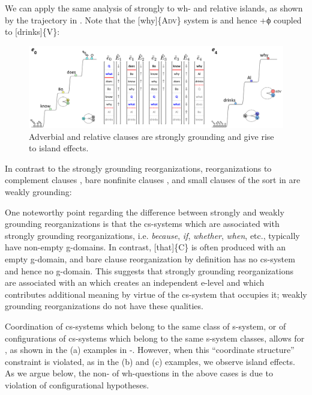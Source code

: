   We can apply the same analysis of strongly  to wh- and relative islands, as shown by the trajectory in {}. Note that the [why]\{A\textsc{dv}\} system is  and hence +ϕ coupled to [drinks]\{V\}:

  
\begin{figure}
\includegraphics[width=\textwidth]{figures/Tilsen-img164.png}
\caption{Adverbial and relative clauses are strongly grounding and give rise to island effects.}
\label{fig:7:20}
\end{figure}
 

  In contrast to the strongly grounding reorganizations, reorganizations to complement clauses , bare nonfinite clauses , and small clauses of the sort in  are weakly grounding:

\ea\label{ex:7:21}
\label{ex:7:21a}
\label{ex:7:21b}
\label{ex:7:21c}
\z
\z

  One noteworthy point regarding the difference between strongly and weakly grounding reorganizations is that the cs-systems which are associated with strongly grounding reorganizations, i.e. \textit{because}, \textit{if}, \textit{whether}, \textit{when}, etc., typically have non-empty g-domains. In contrast, [that]\{C\} is often produced with an empty g-domain, and bare clause reorganization by definition has no cs-system and hence no g-domain. This suggests that strongly grounding reorganizations are associated with an  which creates an independent e-level and which contributes additional meaning by virtue of the cs-system that occupies it; weakly grounding reorganizations do not have these qualities.

  Coordination of cs-systems which belong to the same class of s-system, or of configurations of cs-systems which belong to the same s-system classes, allows for , as shown in the (a) examples in {-}. However, when this “coordinate structure” constraint is violated, as in the (b) and (c) examples, we observe island effects. As we argue below, the non- of wh-questions in the above cases is due to violation of configurational hypotheses.

